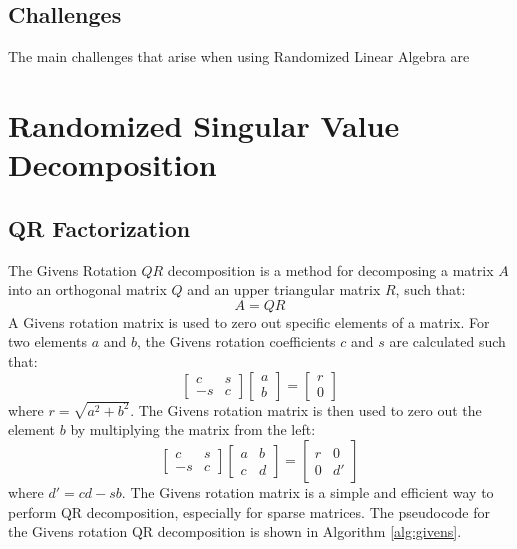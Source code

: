 \documentclass[11pt,a4paper]{article}
\begin{document}
\subsection{Challenges}
The main challenges that arise when using Randomized Linear Algebra are





\section{Randomized Singular Value Decomposition}

\subsection{QR Factorization}
The Givens Rotation $Q R$ decomposition is a method for decomposing a matrix $A$ into an orthogonal matrix $Q$ and an upper triangular matrix $R$, such that:
\[
    A = Q R
\]
A Givens rotation matrix is used to zero out specific elements of a matrix. For two elements $a$ and $b$, the Givens rotation coefficients $c$ and $s$ are calculated such that:
\[
    \begin{bmatrix}
        c  & s \\
        -s & c
    \end{bmatrix}
    \begin{bmatrix}
        a \\
        b
    \end{bmatrix}
    =
    \begin{bmatrix}
        r \\
        0
    \end{bmatrix}
\]
where $r = \sqrt{a^2 + b^2}$. The Givens rotation matrix is then used to zero out the element $b$ by multiplying the matrix from the left:
\[
    \begin{bmatrix}
        c  & s \\
        -s & c
    \end{bmatrix}
    \begin{bmatrix}
        a & b \\
        c & d
    \end{bmatrix}
    =
    \begin{bmatrix}
        r & 0  \\
        0 & d'
    \end{bmatrix}
\]
where $d' = c d - s b$. The Givens rotation matrix is a simple and efficient way to perform QR decomposition, especially for sparse matrices. The pseudocode for the Givens rotation QR decomposition is shown in Algorithm \ref{alg:givens}.
\end{document}
